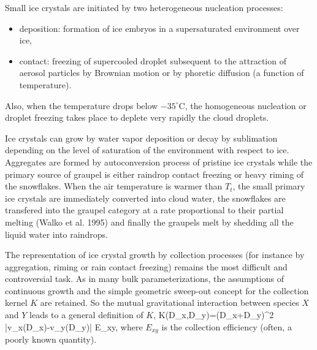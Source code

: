 Small ice crystals are initiated by two heterogeneous nucleation processes:
\begin{itemize}
\item deposition: formation of ice embryos in a supersaturated environment over
ice,
\item contact: freezing of supercooled droplet subsequent to the attraction of
aerosol particles by Brownian motion or by phoretic diffusion (a function of
temperature).
\end{itemize}

Also, when the temperature drops below $-35^\circ$C, the homogeneous nucleation or
droplet freezing takes place to deplete very rapidly the cloud droplets.

Ice crystals can grow by water vapor deposition or decay by sublimation
depending on the level of saturation of the environment with respect to ice.
Aggregates are formed by autoconversion process of pristine ice crystals while
the primary source of graupel is either raindrop contact freezing or heavy
riming of the snowflakes. When the air temperature is warmer than $T_t$, the
small primary ice crystals are immediately converted into cloud water, the
snowflakes are transfered into the graupel category at a rate proportional to
their partial melting (Walko et al. 1995) and finally the graupels melt by
shedding all the liquid water into raindrops.

The representation of ice crystal growth by collection processes (for instance
by aggregation, riming or rain contact freezing) remains the most difficult and
controversial task. As in many bulk parameterizations, the assumptions of
continuous growth and the simple geometric sweep-out concept for the collection kernel $K$ are retained.
So the mutual gravitational interaction between
species $X$ and $Y$ leads to a general definition of $K$,
%
\be\label{ACC1}
K(D_x,D_y)=(D_x+D_y)^2 |v_x(D_x)-v_y(D_y)| E_{xy},
\ee
%
\noindent where $E_{xy}$ is the collection efficiency (often, a poorly known
quantity).

